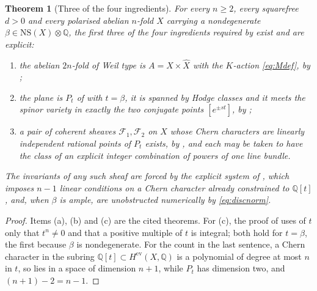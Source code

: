 \documentclass[11pt,reqno]{amsart}
\theoremstyle{plain}
\newtheorem{theorem}{Theorem}[section]
\theoremstyle{definition}
\theoremstyle{remark}
\newcommand{\QQ}{\mathbb{Q}}
\newcommand{\cF}{\mathcal{F}}
\newcommand{\NS}{\mathrm{NS}}
\begin{document}
\begin{theorem}[Three of the four ingredients]\label{thm:twoofthefour}
For every $n\ge2$, every squarefree $d>0$ and every polarised abelian $n$-fold
$X$ carrying a nondegenerate $\beta\in\NS(X)\otimes\QQ$, the first three of the
four ingredients required by  exist and are explicit:
\begin{enumerate}[label=\textup{(\alph*)}]
\item the abelian $2n$-fold of Weil type is $A=X\times\widehat{X}$ with the
  $K$-action \eqref{eq:Mdef}, by ;
\item the plane is $P_{t}$ of  with $t=\beta$, it is
  spanned by Hodge classes and it meets the spinor variety in exactly the two
  conjugate points $[e^{\pm st}]$, by ;
\item a pair of coherent sheaves $\cF_{1},\cF_{2}$ on $X$ whose Chern
  characters are linearly independent rational points of $P_{t}$ exists, by
  , and each may be taken to have the class of an
  explicit integer combination of powers of one line bundle.
\end{enumerate}
The invariants of any such sheaf are forced by the explicit system of
, which imposes $n-1$ linear conditions on a Chern
character already constrained to $\QQ[t]$, and, when $\beta$ is ample, are
unobstructed numerically by \eqref{eq:discnorm}.
\end{theorem}

\begin{proof}
Items (a), (b) and (c) are the cited theorems. For (c), the proof of
 uses of $t$ only that $t^{n}\ne0$ and that a positive
multiple of $t$ is integral; both hold for $t=\beta$, the first because
$\beta$ is nondegenerate. For the count in the last sentence, a Chern
character in the subring $\QQ[t]\subset H^{\mathrm{ev}}(X,\QQ)$ is a
polynomial of degree at most $n$ in $t$, so lies in a space of dimension
$n+1$, while $P_{t}$ has dimension two, and $(n+1)-2=n-1$.
\end{proof}
\end{document}
